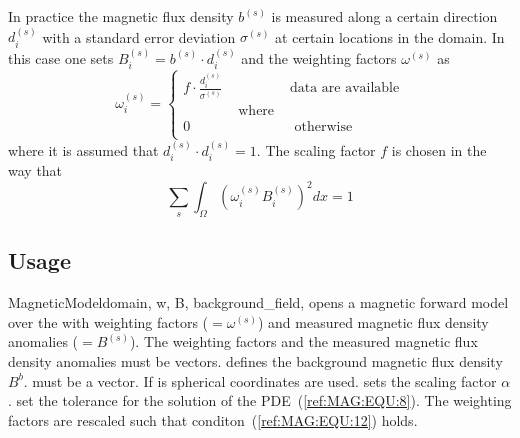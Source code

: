 In practice the magnetic flux density $b^{(s)}$ is measured along a certain direction $d^{(s)}_i$ with a 
standard error deviation $\sigma^{(s)}$ at certain locations in the domain. In this case
one sets $B^{(s)}_i=b^{(s)} \cdot d^{(s)}_i$ and the weighting factors $\omega^{(s)}$ as
\begin{equation}\label{ref:MAG:EQU:11}
\omega^{(s)}_i 
= \left\{
\begin{array}{lcl}
f \cdot  \frac{d^{(s)}_i}{\sigma^{(s)}} & & \mbox{data are available} \\
& \mbox{ where } & \\
0 & & \mbox{ otherwise } \\
\end{array}
\right.
\end{equation} 
where it is assumed that $d^{(s)}_i \cdot d^{(s)}_i =1$. The scaling factor $f$ is chosen in the way that 
\begin{equation}\label{ref:MAG:EQU:12}
\sum_{s} \int_{\Omega} ( \omega^{(s)}_i B^{(s)}_i ) ^2 dx =1 
\end{equation} 

\subsection{Usage}


\begin{classdesc}{MagneticModel}{domain, 
w, B, background_field,
}
opens a magnetic forward model over the \Domain {} with 
weighting factors  ($=\omega^{(s)}$) and measured magnetic flux density anomalies  ($=B^{(s)}$).
The weighting factors and the  measured magnetic flux density anomalies must be vectors.
 defines the background magnetic flux density $B^b$. 
 must be a vector.
If  is \True spherical coordinates are used. 
 sets the scaling factor $\alpha$. 
 set the tolerance for the solution of the PDE~(\ref{ref:MAG:EQU:8}).
The weighting factors are rescaled such that conditon~(\ref{ref:MAG:EQU:12}) holds.
\end{classdesc}


